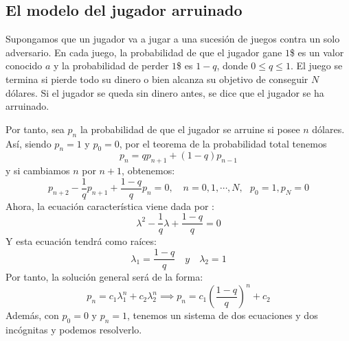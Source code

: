 \documentclass[11pt, a4paper, titlepage]{article}
\theoremstyle{theorem-style}
\theoremstyle{definition-style}
\theoremstyle{remark-style}
\theoremstyle{example-style}
\begin{document}
\subsection{El modelo del jugador arruinado}
Supongamos que un jugador va a jugar a una sucesión de juegos contra un solo adversario. En cada juego, la probabilidad de que el jugador gane $1$\$ es un valor conocido $a$ y la probabilidad de perder $1$\$ es $1-q$, donde $0\leq q \leq 1$. El juego se termina si pierde todo su dinero o bien alcanza su objetivo de conseguir $N$ dólares. Si el jugador se queda sin dinero antes, se dice que el jugador se ha arruinado.

Por tanto, sea $p_n$ la probabilidad de que el jugador se arruine si posee $n$ dólares. Así, siendo $p_n =1$ y $p_0 = 0$, por el teorema de la probabilidad total tenemos
\[
p_n = q p _{n+1} + (1-q) p _{n-1}
\]
y si cambiamos $n$ por $n+1$, obtenemos:
\[
p _{n+2} - \dfrac{1}{q}p _{n+1} + \dfrac{1-q}{q}p_n = 0, \quad n= 0,1,\cdots,N, \ \ \ p_0 = 1, p_N = 0
\]
Ahora, la ecuación característica viene dada por : 
\[
\lambda ^2 - \dfrac{1}{q}\lambda + \dfrac{1-q}{q} = 0
\]
Y esta ecuación tendrá como raíces:
\[
\lambda_1 = \dfrac{1-q}{q} \quad y \quad \lambda_2 = 1
\]
Por tanto, la solución general será de la forma:
\[
p_n = c_1 \lambda_1^n + c_2\lambda_2^n \implies p_n= c_1 (\dfrac{1-q}{q})^n + c_2
\]
Además, con $p_0 = 0$ y $p_n = 1$, tenemos un sistema de dos ecuaciones y dos incógnitas y podemos resolverlo.
\end{document}
